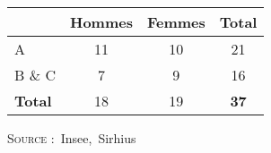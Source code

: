\documentclass{article}
\title{}
\author{}
\date{}
\begin{document}
\maketitle
\baselineskip=16pt

\begin{table}
\centering
{}
\begin{tabular}{l|c|c|c|}
\cline{2-4}
                                     & Hommes & Femmes & \textbf{Total} \\ \hline
\multicolumn{1}{|l|}{A}              & 11     & 10     & 21             \\ \hline
\multicolumn{1}{|l|}{B \& C}         & 7      & 9      & 16             \\ \hline
\multicolumn{1}{|l|}{\textbf{Total}} & 18     & 19     & \textbf{37}    \\ \hline
\end{tabular}

\vspace{0.5cm}
\textsc{Source :}~Insee,~Sirhius
\end{table}
\end{document}
